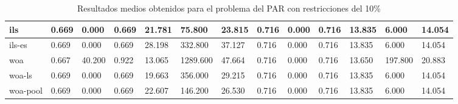\documentclass[11pt]{article}
\begin{document}
\begin{table}[H]
{\begin{tabular}{|l|l|l|l|l|l|l|l|l|l|l|l|l|}
    ils & 0.669 & 0.000  & 0.669 & 21.781 & 75.800 & 23.815	 & 0.716 & 0.000 & 0.716 & 13.835  & 6.000 & 14.054  \\ \hline
    ils-es & 0.669 & 0.000  & 0.669 &  28.198 & 332.800	 & 37.127 & 0.716 & 0.000  & 0.716 &  13.835 & 6.000 & 14.054  \\ \hline
    woa & 0.667 	 & 40.200  & 0.922 &  13.065 & 1289.600 & 47.664 & 0.716 & 0.000  & 0.716 &  13.650 & 197.800  &  	20.883 \\ \hline
    woa-ls & 0.669 & 0.000  & 0.669 &  19.663 & 356.000  & 29.215 & 0.716 & 0.000  & 0.716 &   	 	13.835 & 6.000 &  	14.054  \\ \hline
    woa-pool & 0.669 & 0.000  & 0.669 &  22.607 & 146.200  & 26.530 & 0.716 & 0.000  & 0.716 &   	 	13.835 & 6.000 &  	14.054  \\ \hline

  \end{tabular}}
  \caption{Resultados medios obtenidos para el problema del PAR con restricciones del 10\%}
\end{table}
\end{document}
